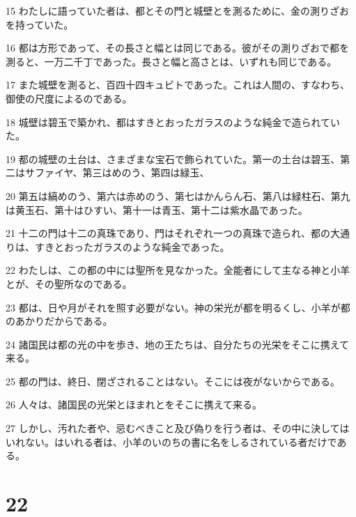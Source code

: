 \par 15 わたしに語っていた者は、都とその門と城壁とを測るために、金の測りざおを持っていた。
\par 16 都は方形であって、その長さと幅とは同じである。彼がその測りざおで都を測ると、一万二千丁であった。長さと幅と高さとは、いずれも同じである。
\par 17 また城壁を測ると、百四十四キュビトであった。これは人間の、すなわち、御使の尺度によるのである。
\par 18 城壁は碧玉で築かれ、都はすきとおったガラスのような純金で造られていた。
\par 19 都の城壁の土台は、さまざまな宝石で飾られていた。第一の土台は碧玉、第二はサファイヤ、第三はめのう、第四は緑玉、
\par 20 第五は縞めのう、第六は赤めのう、第七はかんらん石、第八は緑柱石、第九は黄玉石、第十はひすい、第十一は青玉、第十二は紫水晶であった。
\par 21 十二の門は十二の真珠であり、門はそれぞれ一つの真珠で造られ、都の大通りは、すきとおったガラスのような純金であった。
\par 22 わたしは、この都の中には聖所を見なかった。全能者にして主なる神と小羊とが、その聖所なのである。
\par 23 都は、日や月がそれを照す必要がない。神の栄光が都を明るくし、小羊が都のあかりだからである。
\par 24 諸国民は都の光の中を歩き、地の王たちは、自分たちの光栄をそこに携えて来る。
\par 25 都の門は、終日、閉ざされることはない。そこには夜がないからである。
\par 26 人々は、諸国民の光栄とほまれとをそこに携えて来る。
\par 27 しかし、汚れた者や、忌むべきこと及び偽りを行う者は、その中に決してはいれない。はいれる者は、小羊のいのちの書に名をしるされている者だけである。

\chapter{22}

